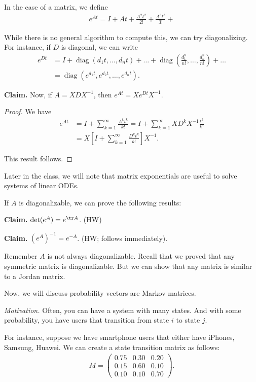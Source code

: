 \documentclass{article}
\newcommand{\mat}[1]{\begin{pmatrix}#1\end{pmatrix}}
\DeclareMathOperator{\diag}{diag}
\begin{document}
In the case of a matrix, we define
\begin{align*}
  e^{At} = I + At + \frac{A^2 t^2}{2!} + \frac{A^3 t^3}{3!} + 
\end{align*}

While there is no general algorithm to compute this, we can try diagonalizing.  For instance, if $D$ is diagonal, we can write
\begin{align*}
  e^{Dt} &= I + \diag(d_1t, \dots, d_n t) + \dots + \diag(\frac{d_1^n}{n!}, \dots, \frac{d_n^n}{n!}) + \dots \\
  &= \diag(e^{d_1 t}, e^{d_2 t}, \dots, e^{d_n t}).
\end{align*}

{\bf Claim.} Now, if $A = X D X^{-1}$, then $e^{At} = X e^{Dt} X^{-1}$.

\begin{proof}
  We have
  \begin{align*}
    e^{At} &= I + \sum_{k=1}^{\infty} \frac{A^k t^k}{k!} = I + \sum_{k=1}^{\infty} X D^k X^{-1} \frac{t^k}{k!} \\
    &= X \left[ I + \sum_{k=1}^{\infty} \frac{D^k t^k}{k!} \right] X^{-1}.
  \end{align*}

  This result follows.
\end{proof}

Later in the class, we will note that matrix exponentials are useful to solve systems of linear ODEs.

If $A$ is diagonalizable, we can prove the following results:

{\bf Claim.} $\det (e^A) = e^{\tr A}$. (HW)

{\bf Claim.} $(e^A)^{-1} = e^{-A}$. (HW; follows immediately).

Remember $A$ is not always diagonalizable.  Recall that we proved that any symmetric matrix is diagonalizable.  But we can show that any matrix is similar to a Jordan matrix.

Now, we will discuss probability vectors are Markov matrices.

{\it Motivation.} Often, you can have a system with many states.  And with some probability, you have users that transition from state $i$ to state $j$.

For instance, suppose we have smartphone users that either have iPhones, Samsung, Huawei.  We can create a state transition matrix as follows:
\begin{align*}
 M = \mat{0.75 & 0.30 & 0.20 \\ 0.15 & 0.60 & 0.10 \\ 0.10 & 0.10 & 0.70}.
\end{align*}
\end{document}
